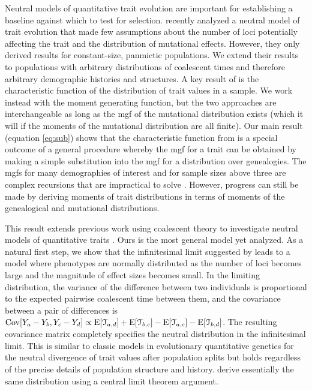 Neutral models of quantitative trait evolution are important for establishing a
baseline against which to test for selection. \citet{Schraiber2015} recently
analyzed a neutral model of trait evolution that made few assumptions about the
number of loci potentially affecting the trait and the distribution of
mutational effects. However, they only derived results for constant-size,
panmictic populations. We extend their results to populations with arbitrary
distributions of coalescent times and therefore arbitrary demographic histories
and structures. A key result of \citet{Schraiber2015} is the characteristic
function of the distribution of trait values in a sample. We work instead with
the moment generating function, but the two approaches are interchangeable as
long as the mgf of the mutational distribution exists (which it will if the
moments of the mutational distribution are all finite). Our main result
(equation \eqref{eq:sub}) shows that the characteristic function
from \citet{Schraiber2015} is a special outcome of a general procedure whereby
the mgf for a trait can be obtained by making a simple substitution into the mgf
for a distribution over genealogies. The mgfs for many demographies of interest
and for sample sizes above three are complex recursions that are impractical to
solve \citep{Lohse2011}. However, progress can still be made by deriving moments
of trait distributions in terms of moments of the genealogical and mutational
distributions.

This result extends previous work using coalescent theory to investigate neutral
models of quantitative traits \citep{Whitlock1999,Schraiber2015}. Ours is the
most general model yet analyzed. As a natural first step, we show that the
infinitesimal limit suggested by \citet{Fisher1918} leads to a model where
phenotypes are normally distributed as the number of loci becomes large and the
magnitude of effect sizes becomes small. In the limiting distribution, the
variance of the difference between two individuals is proportional to the
expected pairwise coalescent time between them, and the covariance between a
pair of differences is $\mathrm{Cov}[Y_a - Y_b,Y_c - Y_d] \propto \mathrm{E}[\mathcal{T}_{a,d}]
+ \mathrm{E}[\mathcal{T}_{b,c}] -
\mathrm{E}[\mathcal{T}_{a,c}] - \mathrm{E}[\mathcal{T}_{b,d}]$. The resulting covariance matrix
completely specifies the neutral distribution in the infinitesimal limit. This
is similar to classic models in evolutionary quantitative genetics for the
neutral divergence of trait values after population splits
\citep{Lande1976,Lynch1989} but holds regardless of the precise details of
population structure and history. \citet{Schraiber2015} derive essentially the
same distribution using a central limit theorem argument.

